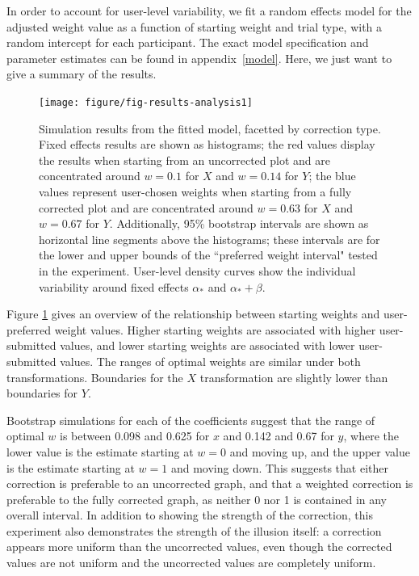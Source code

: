 \documentclass[12pt]{article}\usepackage[]{graphicx}\usepackage[]{color}
\newcommand{\done}[2][inline]{\todo[color=SpringGreen, #1]{#2}}  %
\newcommand{\newdo}[1]{\todo[inline, color=Plum]{#1}} %
\begin{document}
In order to account for user-level variability, we fit a random effects model for the adjusted weight value as a function of  starting weight and trial type, with a random intercept for each participant. The exact model specification and parameter estimates can be found in appendix~\ref{model}. Here, we just want to give a summary of the results. 

\begin{figure}[hbtp]
\centering
\texttt{[image: figure/fig-results-analysis1]}
\caption{Simulation results from the fitted model, facetted by correction type. Fixed effects results are shown as histograms; the red values display the results when starting from an uncorrected plot and are concentrated around $w=0.1$ for $X$ and $w=0.14$ for $Y$; the blue values represent user-chosen weights when starting from a fully corrected plot and are concentrated around $w=0.63$ for $X$ and $w=0.67$ for $Y$. Additionally, 95\% bootstrap intervals are shown as horizontal line segments above the histograms; these intervals are for the lower and upper bounds of the ``preferred weight interval" tested in the experiment. User-level density curves show the individual variability around  fixed effects $\alpha_*$ and $\alpha_*+\beta$.}\label{fig:MixedModelResults}
\end{figure}
Figure \ref{fig:MixedModelResults} gives an overview of the relationship between starting weights and  user-preferred weight values. Higher starting weights are associated with higher user-submitted values, and lower starting weights are associated with lower user-submitted values. The ranges of optimal weights are similar under both transformations. Boundaries for the $X$ transformation are slightly lower than boundaries for $Y$. 




Bootstrap simulations for each of the coefficients suggest that the range of optimal $w$ is between 0.098 and 0.625 for $x$ and 0.142 and 0.67 for $y$, where the lower value is the estimate starting at $w=0$ and moving up, and the upper value is the estimate starting at $w=1$ and moving down. This suggests that either correction is preferable to an uncorrected graph, and that a weighted correction is preferable to the fully corrected graph, as neither 0 nor 1 is contained in any overall interval. In addition to showing the strength of the correction, this experiment also demonstrates the strength of the illusion itself: a correction appears more uniform than the uncorrected values, even though the corrected values are not uniform and the uncorrected values are completely uniform. 
\end{document}
